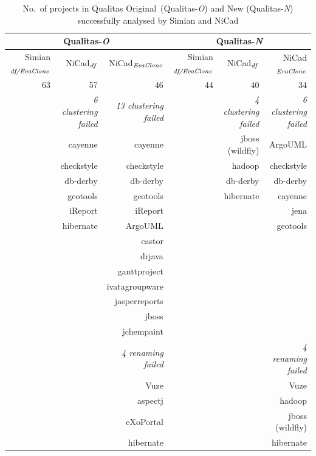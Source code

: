 \documentclass{sig-alternate-05-2015}
\begin{document}
\begin{table}
	\centering
	\caption{No.~of projects in Qualitas Original~(Qualitas-\textit{O}) and New (Qualitas-\textit{N}) successfully analysed by Simian and NiCad}
	\label{tab:projects_missing}
	\small
	\begin{tabular}{r|r|r|r|r|r}
		\hline
		\multicolumn{3}{c|}{Qualitas-\textit{O}} & \multicolumn{3}{c}{Qualitas-\textit{N}} \\
		\hline
		Simian$_{\textrm{\textit{df/EvaClone}}}$ & NiCad$_{\textrm{\textit{df}}}$ & NiCad$_{\textrm{\textit{EvaClone}}}$ & Simian$_{\textrm{\textit{df/EvaClone}}}$ & NiCad$_{\textrm{\textit{df}}}$ & NiCad$_{\textrm{\textit{EvaClone}}}$ \\ \hline
		63	& 57 & 46 & 44 & 40 & 34 \\
		\hline
		& \textit{6 clustering failed} & \textit{13 clustering failed} & & \textit{4 clustering failed} & \textit{6 clustering failed} \\
		& cayenne   & cayenne 	& & jboss (wildfly) & ArgoUML \\
		& checkstyle & checkstyle & & hadoop & checkstyle \\
		& db-derby 	& db-derby 	& & db-derby & db-derby \\
		& geotools 	& geotools  & & hibernate & cayenne \\
		& iReport 	& iReport   & & & jena \\
		& hibernate & ArgoUML 	& & & geotools \\
		&			& castor 		& & & \\
		&			& drjava 		& & & \\
		&			& ganttproject 	& & & \\
		&			& ivatagroupware & & &  \\
		&			& jasperreports & & & \\
		&			& jboss 		& & & \\
		&			& jchempaint 	& & & \\
		\hline
		& 			&  \textit{4 renaming failed} & & & \textit{4 renaming failed} \\
		&			& Vuze 		& & & Vuze \\
		&			& aspectj 	& & & hadoop \\
		&			& eXoPortal 	& & & jboss (wildfly) \\
		&			&  hibernate 	& & & hibernate \\
		\hline
	\end{tabular}
\end{table}
\end{document}
